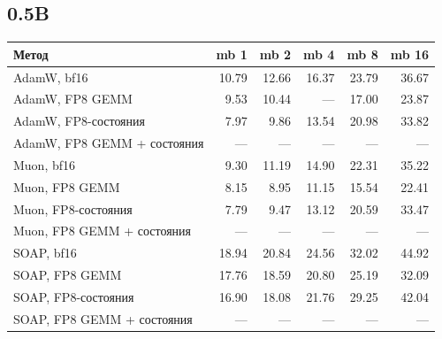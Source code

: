 \documentclass[10pt]{article}
\begin{document}
\subsection{0.5B}
\begin{center}
\small
\begin{tabular}{lrrrrr}
\toprule
\textbf{Метод} & \textbf{mb 1} & \textbf{mb 2} & \textbf{mb 4} & \textbf{mb 8} & \textbf{mb 16} \\
\midrule
AdamW, bf16 & 10.79 & 12.66 & 16.37 & 23.79 & 36.67 \\
AdamW, FP8 GEMM & 9.53 & 10.44 & --- & 17.00 & 23.87 \\
AdamW, FP8-состояния & 7.97 & 9.86 & 13.54 & 20.98 & 33.82 \\
AdamW, FP8 GEMM + состояния & --- & --- & --- & --- & --- \\
Muon, bf16 & 9.30 & 11.19 & 14.90 & 22.31 & 35.22 \\
Muon, FP8 GEMM & 8.15 & 8.95 & 11.15 & 15.54 & 22.41 \\
Muon, FP8-состояния & 7.79 & 9.47 & 13.12 & 20.59 & 33.47 \\
Muon, FP8 GEMM + состояния & --- & --- & --- & --- & --- \\
SOAP, bf16 & 18.94 & 20.84 & 24.56 & 32.02 & 44.92 \\
SOAP, FP8 GEMM & 17.76 & 18.59 & 20.80 & 25.19 & 32.09 \\
SOAP, FP8-состояния & 16.90 & 18.08 & 21.76 & 29.25 & 42.04 \\
SOAP, FP8 GEMM + состояния & --- & --- & --- & --- & --- \\
\bottomrule
\end{tabular}
\end{center}
\end{document}
